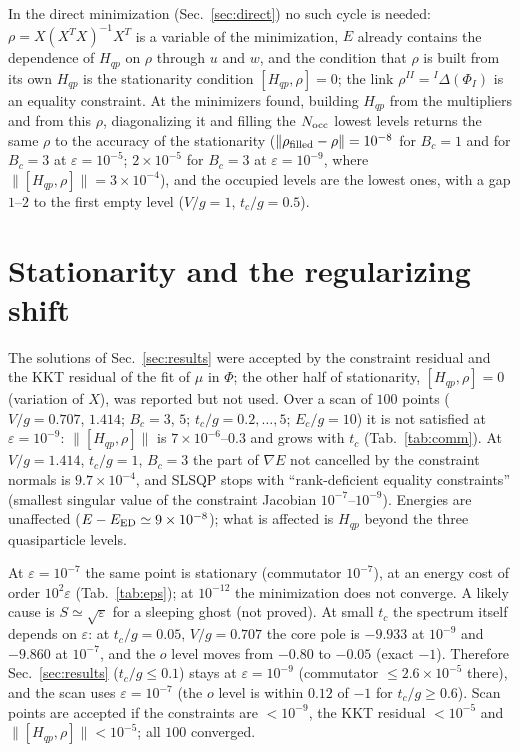 \documentclass[11pt]{article}
\begin{document}
In the direct minimization (Sec.~\ref{sec:direct}) no such cycle is needed: $\rho=X(X^TX)^{-1}X^T$ is a variable of the minimization, $E$ already contains the dependence of $H_{qp}$ on $\rho$
through $u$ and $w$, and the condition that $\rho$ is built from its own $H_{qp}$ is the stationarity condition $[H_{qp},\rho]=0$; the link $\rho^{II}={}^I\Delta(\Phi_I)$ is an equality constraint.
At the minimizers found, building $H_{qp}$ from the multipliers and from this $\rho$, diagonalizing it and filling the $N_{\rm occ}$ lowest levels returns the same $\rho$ to the accuracy of the stationarity
($\|\rho_{\rm filled}-\rho\|=10^{-8}$ for $B_c=1$ and for $B_c=3$ at $\varepsilon=10^{-5}$; $2\times10^{-5}$ for $B_c=3$ at $\varepsilon=10^{-9}$, where $\|[H_{qp},\rho]\|=3\times10^{-4}$), and the occupied levels are the lowest ones,
with a gap $1$--$2$ to the first empty level ($V/g=1$, $t_c/g=0.5$).

\section{Stationarity and the regularizing shift}
\label{sec:stationarity}

The solutions of Sec.~\ref{sec:results} were accepted by the constraint residual and the KKT residual of the fit of $\mu$ in $\Phi$; the other half of stationarity, $[H_{qp},\rho]=0$ (variation of $X$), was reported but not used.
Over a scan of $100$ points ($V/g=0.707$, $1.414$; $B_c=3$, $5$; $t_c/g=0.2,\dots,5$; $E_c/g=10$) it is not satisfied at $\varepsilon=10^{-9}$: $\|[H_{qp},\rho]\|$ is $7\times10^{-6}$--$0.3$ and grows with $t_c$ (Tab.~\ref{tab:comm}).
At $V/g=1.414$, $t_c/g=1$, $B_c=3$ the part of $\nabla E$ not cancelled by the constraint normals is $9.7\times10^{-4}$, and SLSQP stops with ``rank-deficient equality constraints'' (smallest singular value of the constraint Jacobian $10^{-7}$--$10^{-9}$).
Energies are unaffected ($E-E_{\rm ED}\simeq9\times10^{-8}$); what is affected is $H_{qp}$ beyond the three quasiparticle levels.



At $\varepsilon=10^{-7}$ the same point is stationary (commutator $10^{-7}$), at an energy cost of order $10^2\varepsilon$ (Tab.~\ref{tab:eps}); at $10^{-12}$ the minimization does not converge. A likely cause is $S\simeq\sqrt\varepsilon$ for a sleeping ghost (not proved).
At small $t_c$ the spectrum itself depends on $\varepsilon$: at $t_c/g=0.05$, $V/g=0.707$ the core pole is $-9.933$ at $10^{-9}$ and $-9.860$ at $10^{-7}$, and the $o$ level moves from $-0.80$ to $-0.05$ (exact $-1$). Therefore Sec.~\ref{sec:results} ($t_c/g\le0.1$) stays at $\varepsilon=10^{-9}$ (commutator $\le2.6\times10^{-5}$ there),
and the scan uses $\varepsilon=10^{-7}$ (the $o$ level is within $0.12$ of $-1$ for $t_c/g\ge0.6$). Scan points are accepted if the constraints are $<10^{-9}$, the KKT residual $<10^{-5}$ and $\|[H_{qp},\rho]\|<10^{-5}$; all $100$ converged.
\end{document}
